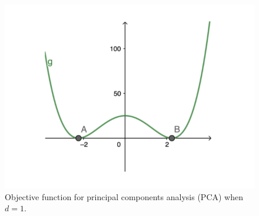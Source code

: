\begin{figure}[ht!]
    \centering
    \includegraphics[scale = 0.4]{figures/pca.png}
    \caption{Objective function for principal components analysis (PCA) when $d = 1$.}
    \label{lec10:fig:pca_objective}
\end{figure}


